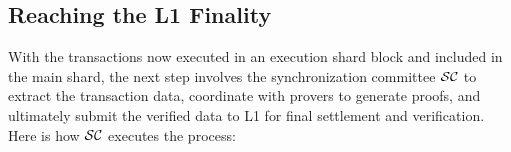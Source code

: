 \subsection{Reaching the L1 Finality}

With the transactions now executed in an execution shard block and
included in the main shard, the next step involves the synchronization
committee ${\mathcal{SC}}$ to extract the transaction data, coordinate with
provers to generate proofs, and ultimately submit the verified data to L1
for final settlement and verification.
Here is how  ${\mathcal{SC}}$ executes
the process:

